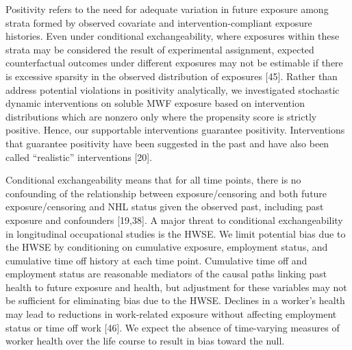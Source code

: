 \documentclass[
  11pt,
  letterpaper,
  DIV=11,
  numbers=noendperiod]{scrartcl}
\begin{document}
Positivity refers to the need for adequate variation in future exposure
among strata formed by observed covariate and intervention-compliant
exposure histories. Even under conditional exchangeability, where
exposures within these strata may be considered the result of
experimental assignment, expected counterfactual outcomes under
different exposures may not be estimable if there is excessive sparsity
in the observed distribution of exposures {[}45{]}. Rather than address
potential violations in positivity analytically, we investigated
stochastic dynamic interventions on soluble MWF exposure based on
intervention distributions which are nonzero only where the propensity
score is strictly positive. Hence, our supportable interventions
guarantee positivity. Interventions that guarantee positivity have been
suggested in the past and have also been called ``realistic''
interventions {[}20{]}.

Conditional exchangeability means that for all time points, there is no
confounding of the relationship between exposure/censoring and both
future exposure/censoring and NHL status given the observed past,
including past exposure and confounders {[}19,38{]}. A major threat to
conditional exchangeability in longitudinal occupational studies is the
HWSE. We limit potential bias due to the HWSE by conditioning on
cumulative exposure, employment status, and cumulative time off history
at each time point. Cumulative time off and employment status are
reasonable mediators of the causal paths linking past health to future
exposure and health, but adjustment for these variables may not be
sufficient for eliminating bias due to the HWSE. Declines in a worker's
health may lead to reductions in work-related exposure without affecting
employment status or time off work {[}46{]}. We expect the absence of
time-varying measures of worker health over the life course to result in
bias toward the null.
\end{document}
